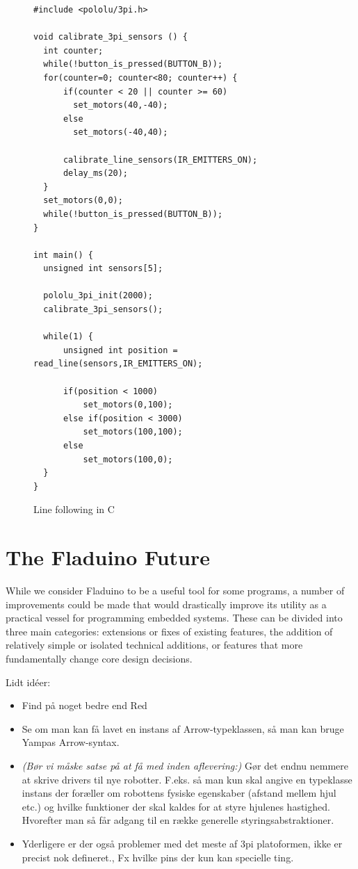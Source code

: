 \documentclass[a4paper, oneside, final]{memoir}
\begin{document}
\begin{figure}
  \centering
\begin{verbatim}
#include <pololu/3pi.h>

void calibrate_3pi_sensors () {
  int counter;
  while(!button_is_pressed(BUTTON_B));
  for(counter=0; counter<80; counter++) {
      if(counter < 20 || counter >= 60)
        set_motors(40,-40);
      else
        set_motors(-40,40);

      calibrate_line_sensors(IR_EMITTERS_ON);
      delay_ms(20);
  }
  set_motors(0,0);
  while(!button_is_pressed(BUTTON_B));
}

int main() {
  unsigned int sensors[5];

  pololu_3pi_init(2000);
  calibrate_3pi_sensors();

  while(1) {
      unsigned int position = read_line(sensors,IR_EMITTERS_ON);

      if(position < 1000)
          set_motors(0,100);
      else if(position < 3000) 
          set_motors(100,100);
      else 
          set_motors(100,0);
  }
}
\end{verbatim}
  \caption{Line following in C}
  \label{fig:linefollow-in-c}
\end{figure}




\chapter{The Fladuino Future}
\label{chap:futurework}

While we consider Fladuino to be a useful tool for some programs, a
number of improvements could be made that would drastically improve
its utility as a practical vessel for programming embedded systems.
These can be divided into three main categories: extensions or fixes
of existing features, the addition of relatively simple or isolated
technical additions, or features that more fundamentally change core
design decisions.

Lidt idéer:
\begin{itemize}
\item Find på noget bedre end Red 
\item Se om man kan få lavet en instans af Arrow-typeklassen, så man
  kan bruge Yampas Arrow-syntax.
\item \textit{(Bør vi måske satse på at få med inden aflevering:)}
  Gør det endnu nemmere at skrive drivers til nye
  robotter. F.eks. så man kun skal angive en typeklasse instans der
  foræller om robottens fysiske egenskaber (afstand mellem hjul etc.)
  og hvilke funktioner der skal kaldes for at styre hjulenes
  hastighed. Hvorefter man så får adgang til en række generelle
  styringsabstraktioner.

\item  Yderligere er der også problemer med det meste af 3pi platoformen, ikke
  er precist nok defineret., Fx hvilke pins der kun kan specielle ting.
\end{itemize}
\end{document}
